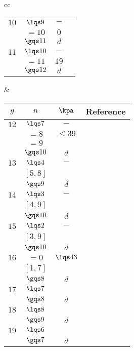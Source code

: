 \documentclass[article, a4paper, twoside]{universal}
\begin{document}
\begin{table}[H]
\begin{tabular}{cc}
\begin{tabular}[t]{cccc}
		  	\hline
		  	$10$& $\lqs9$  & $-$ & \cite{FP2005Effective} \\
				& $=10$ & $0$ & \cite{FP2005Effective} \\
				& $\gqs11$ & $d$ & \cite{FP2005Effective} \\
		  	\hline
		  	$11$& $\lqs10$ & $-$ & \cite{Logan2003} \\
				& $=11$ & $19$& \cite{Logan2003} \\
				& $\gqs12$ & $d$ & \cite{Farkas2009} \\
		  	\bottomrule
		\end{tabular} &
		\begin{tabular}[t]{cccc}
		  	\toprule
		  	$g$ & $n$   & $\kpa$ & Reference \\
		  	\midrule
		  	$12$& $\lqs7$  & $-$ & \cite{AB2021} \\
				& $=8$  & $\leq39$ & \cite{AB2021} \\
				& $=9$  & \red{NK} & \\
				& $\gqs10$ & $d$ & \cite{Kadikoylu2020} \\
		  	\hline
		  	$13$& $\lqs4$  & $-$ & \cite{AB2021} \\
				& $[5,8]$ & \red{NK} & \\
				& $\gqs9$  & $d$ & \cite{FJP2021} \\
		  	\hline
			$14$& $\lqs3$  & $-$ & \cite{AB2021} \\
				& $[4,9]$ & \red{NK} & \\
				& $\gqs10$ & $d$ & \cite{AB2021} \\
		  	\hline
		  	$15$& $\lqs2$  & $-$ & \cite{AB2021} \\
				& $[3,9]$ & \red{NK} & \\
				& $\gqs10$ & $d$ & \cite{AB2021} \\
		  	\hline
		  	$16$& $=0$  & $\lqs43$ & \cite{AB2021} \\
				& $[1,7]$ & \red{NK} & \\
				& $\gqs8$ & $d$ & \cite{Kadikoylu2020} \\
		  	\hline
			$17$& $\lqs7$ & \red{NK} & \\
				& $\gqs8$ & $d$ & \cite{Kadikoylu2020} \\
		  	\hline
		  	$18$& $\lqs8$ & \red{NK} & \\
				& $\gqs9$ & $d$ & \cite{Farkas2009} \\
		  	\hline
			$19$& $\lqs6$ & \red{NK} & \\
				& $\gqs7$ & $d$ & \cite{Farkas2009} \\

\end{tabular}
\end{tabular}
\end{table}
\end{document}
